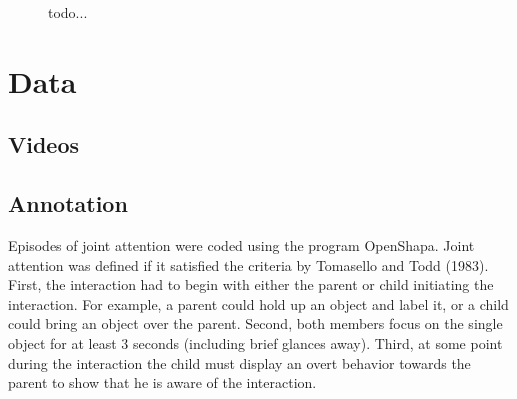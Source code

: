 \documentclass[10pt,letterpaper]{article}
\begin{document}


\begin{figure}[h]
     \begin{center}
          \end{center}
    \caption{todo... 
     }
   \label{fig:main}
\end{figure}

\section{Data}

\subsection{Videos}


\subsection{Annotation}

Episodes of joint attention were coded using the program OpenShapa. Joint attention was defined if it satisfied the criteria by Tomasello and Todd (1983). First, the interaction had to begin with either the parent or child initiating the interaction. For example, a parent could hold up an object and label it, or a child could bring an object over the parent. Second, both members focus on the single object for at least 3 seconds (including brief glances away). Third, at some point during the interaction the child must display an overt behavior towards the parent to show that he is aware of the interaction. 
\end{document}
